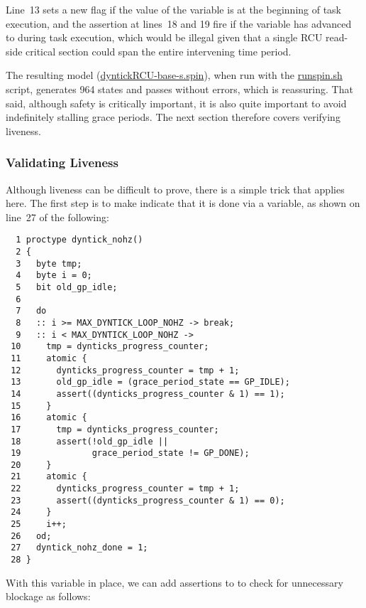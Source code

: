Line~13 sets a new  flag if the
value of the  variable is
 at the beginning of task execution,
and the assertion at lines~18 and 19 fire if the 
variable has advanced to  during task execution,
which would be illegal given that a single RCU read-side critical
section could span the entire intervening time period.

The resulting
model (\url{dyntickRCU-base-s.spin}),
when run with the \url{runspin.sh} script,
generates 964 states and passes without errors, which is reassuring.
That said, although safety is critically important, it is also quite
important to avoid indefinitely stalling grace periods.
The next section therefore covers verifying liveness.

\subsubsection{Validating Liveness}
\label{app:formal:Validating Liveness}

Although liveness can be difficult to prove, there is a simple
trick that applies here.
The first step is to make  indicate that
it is done via a  variable, as shown on
line~27 of the following:

{ \scriptsize
\begin{verbatim}
  1 proctype dyntick_nohz()
  2 {
  3   byte tmp;
  4   byte i = 0;
  5   bit old_gp_idle;
  6
  7   do
  8   :: i >= MAX_DYNTICK_LOOP_NOHZ -> break;
  9   :: i < MAX_DYNTICK_LOOP_NOHZ ->
 10     tmp = dynticks_progress_counter;
 11     atomic {
 12       dynticks_progress_counter = tmp + 1;
 13       old_gp_idle = (grace_period_state == GP_IDLE);
 14       assert((dynticks_progress_counter & 1) == 1);
 15     }
 16     atomic {
 17       tmp = dynticks_progress_counter;
 18       assert(!old_gp_idle ||
 19              grace_period_state != GP_DONE);
 20     }
 21     atomic {
 22       dynticks_progress_counter = tmp + 1;
 23       assert((dynticks_progress_counter & 1) == 0);
 24     }
 25     i++;
 26   od;
 27   dyntick_nohz_done = 1;
 28 }
\end{verbatim}
}

With this variable in place, we can add assertions to
 to check for unnecessary blockage
as follows:

